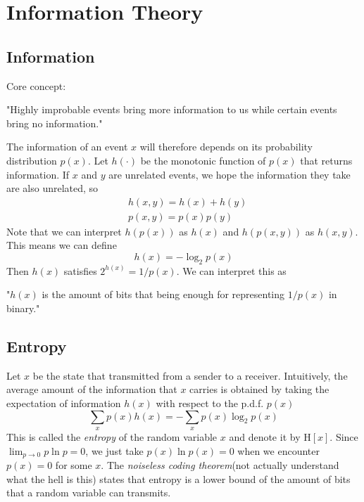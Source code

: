 \documentclass[../main.tex]{subfiles}
\begin{document}
    \section{Information Theory}
        \subsection{Information}
            Core concept:
            \begin{displayquote}
                "Highly improbable events bring more information to us while certain events bring no information."
            \end{displayquote}
            
            The information of an event $x$ will therefore depends on its probability distribution $p(x)$. Let $h(\cdot)$ be the monotonic function of $p(x)$ that returns information. If $x$ and $y$ are unrelated events, we hope the information they take are also unrelated, so
            \begin{align*}
                &h(x,y)=h(x) + h(y)\\
                &p(x,y)=p(x)p(y)
            \end{align*}
            Note that we can interpret $h(p(x))$ as $h(x)$ and $h(p(x, y))$ as $h(x, y)$. 
            This means we can define
            \[
                h(x)=-\log_2p(x)
            \]
            Then $h(x)$ satisfies $2^{h(x)}=1/p(x)$. We can interpret this as
            \begin{displayquote}
                "$h(x)$ is the amount of bits that being enough for representing $1/p(x)$ in binary."
            \end{displayquote}
        \subsection{Entropy}
            Let $x$ be the state that transmitted from a sender to a receiver.
            Intuitively, the average amount of the information that $x$ carries is obtained by taking the expectation of information $h(x)$ with respect to the p.d.f. $p(x)$
            \[
                \sum_x p(x)h(x)=-\sum_x p(x)\log_2p(x)
            \]
            This is called the \textit{entropy} of the random variable $x$ and denote it by $\mathrm{H}[x]$. Since $\lim_{p\rightarrow0}p\ln p=0$, we just take $p(x)\ln p(x)=0$ when we encounter $p(x)=0$ for some $x$. The \textit{noiseless coding theorem}(not actually understand what the hell is this) states that entropy is a lower bound of the amount of bits that a random variable can transmits.
            
\end{document}
